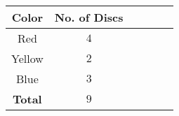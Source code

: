 \normalsize \begin{tabular}{|c|c|c|c|c|c|}

\hline
\textbf{Color} & \textbf{No. of Discs} \\
\hline
  Red          &     $4$\\
\hline
  Yellow        &     $2$\\
\hline
  Blue          &     $3$\\
\hline
\textbf{Total}        &     $9$\\
\hline
\end{tabular}
